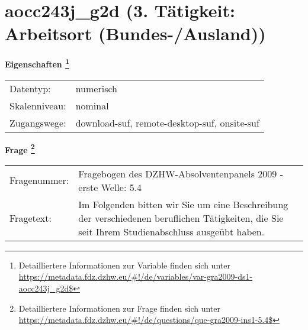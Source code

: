 
    \setcounter{footnote}{0}

    \vspace*{-1.8cm}
	\section{aocc243j\_g2d (3. Tätigkeit: Arbeitsort (Bundes-/Ausland))}
	\label{section:aocc243j_g2d}



    \vspace*{0.5cm}
    \noindent\textbf{Eigenschaften
	\footnote{Detailliertere Informationen zur Variable finden sich unter
		\url{https://metadata.fdz.dzhw.eu/\#!/de/variables/var-gra2009-ds1-aocc243j_g2d$}}}\\
	\begin{tabularx}{\hsize}{@{}lX}
	Datentyp: & numerisch \\
	Skalenniveau: & nominal \\
	Zugangswege: &
	  download-suf, 
	  remote-desktop-suf, 
	  onsite-suf
 \\
    \end{tabularx}



				\vspace*{0.5cm}
                \noindent\textbf{Frage
	                \footnote{Detailliertere Informationen zur Frage finden sich unter
		              \url{https://metadata.fdz.dzhw.eu/\#!/de/questions/que-gra2009-ins1-5.4$}}}\\
				\begin{tabularx}{\hsize}{@{}lX}
					Fragenummer: &
					  Fragebogen des DZHW-Absolventenpanels 2009 - erste Welle:
					  5.4
 \\
					Fragetext: & Im Folgenden bitten wir Sie um eine Beschreibung der verschiedenen beruflichen Tätigkeiten, die Sie seit Ihrem Studienabschluss ausgeübt haben. \\
				\end{tabularx}





